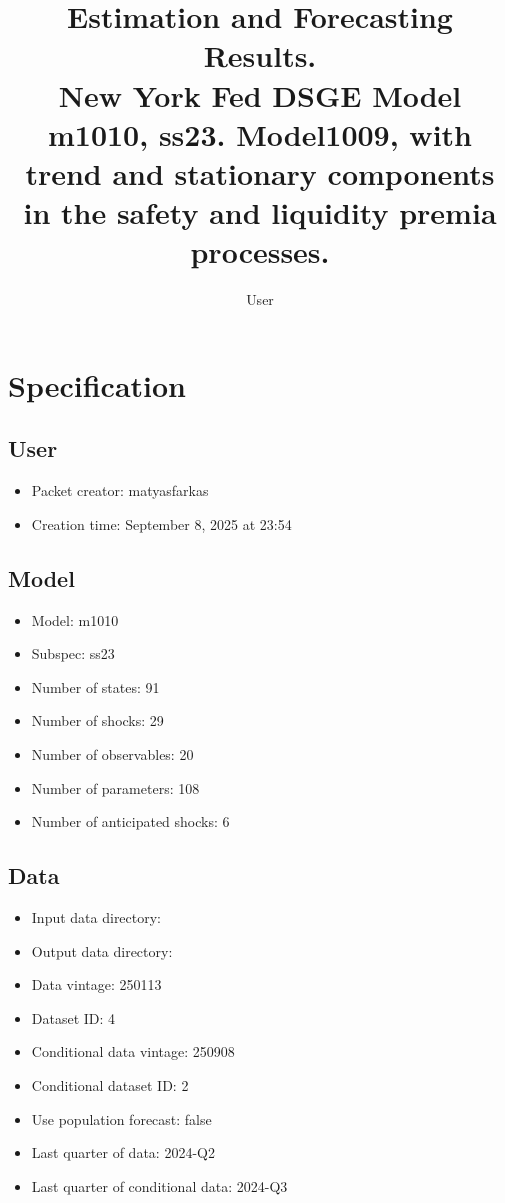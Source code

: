 \documentclass{article}
\title{Estimation and Forecasting Results. \\ New York Fed DSGE Model m1010, ss23. Model1009, with trend and stationary components in the safety and liquidity premia processes.}
\author{User}
\begin{document}
\maketitle


\section{Specification}

\subsection{User}

\begin{itemize}
  \item Packet creator: matyasfarkas
  \item Creation time: September 8, 2025 at 23:54
\end{itemize}

\subsection{Model}

\begin{itemize}
  \item Model: m1010
  \item Subspec: ss23
  \item Number of states: 91
  \item Number of shocks: 29
  \item Number of observables: 20
  \item Number of parameters: 108
  \item Number of anticipated shocks: 6
\end{itemize}

\subsection{Data}

\begin{itemize}
  \item Input data directory: 
  \item Output data directory: 
  \item Data vintage: 250113
  \item Dataset ID: 4
  \item Conditional data vintage: 250908
  \item Conditional dataset ID: 2
  \item Use population forecast: false
  \item Last quarter of data: 2024-Q2
  \item Last quarter of conditional data: 2024-Q3
\end{itemize}
\end{document}
